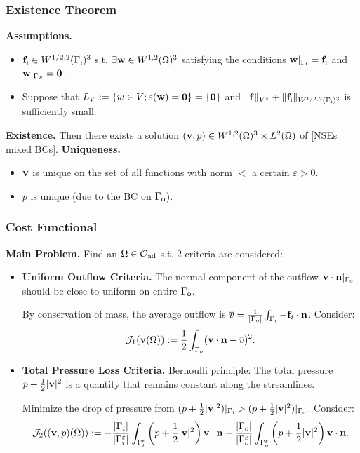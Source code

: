 \documentclass[t,xcolor=table,english]{beamer}   %
\begin{document}
\begin{frame}
	\frametitle{Existence Theorem}
	\begin{theorem}
		\textbf{Assumptions.}
		\begin{itemize}
			\item ${\bf f}_{\rm i}\in W^{1/2,2}(\Gamma_{\rm i})^3$ s.t. $\exists {\bf w}\in W^{1,2}(\Omega)^3$ satisfying the conditions ${\bf w}|_{\Gamma_{\rm i}} = {\bf f}_{\rm i}$ and ${\bf w}|_{\Gamma_{\rm w}} = {\bf 0}$.
			\item Suppose that $L_V := \{w\in V;\varepsilon({\bf w}) = {\bf 0}\} = \{{\bf 0}\}$ and $\|{\bf f}\|_{V^\star} + \|{\bf f}_{\rm i}\|_{W^{1/2,2}(\Gamma_{\rm i})^3}$ is sufficiently small.
		\end{itemize}
		\textbf{Existence.} Then there exists a solution $({\bf v},p)\in W^{1,2}(\Omega)^3\times L^2(\Omega)$ of \eqref{NSEs mixed BCs}.
		\textbf{Uniqueness.}
		\begin{itemize}
			\item ${\bf v}$ is unique on the set of all functions with norm $<$ a certain $\varepsilon > 0$.
			\item $p$ is unique (due to the BC on $\Gamma_{\rm o}$).
		\end{itemize}
	\end{theorem}
\end{frame}

\begin{frame}
	\frametitle{Cost Functional}
	\textbf{Main Problem.} Find an $\Omega\in\mathcal{O}_{\rm ad}$ s.t. 2 criteria are considered:
	\begin{itemize}
		\item \textbf{Uniform Outflow Criteria.} The normal component of the outflow ${\bf v}\cdot{\bf n}|_{\Gamma_{\rm o}}$ should be close to uniform on entire $\Gamma_{\rm o}$.
		
		By conservation of mass, the average outflow is $\overline{v} = \frac{1}{|\Gamma_o|} \int_{\Gamma_i} - {\bf f}_i\cdot {\bf n}$. Consider:	
		\begin{align*}
		\mathcal{J}_1({\bf v}(\Omega)) := \frac{1}{2}\int_{\Gamma_o} ({\bf v}\cdot {\bf n} - \overline{v})^2.
		\end{align*}
		\item \textbf{Total Pressure Loss Criteria.} Bernoulli principle: The total pressure $p + \frac{1}{2}|{\bf v}|^2$ is a quantity that remains constant along the streamlines.
		
		Minimize the drop of pressure from $(p + \frac{1}{2}|{\bf v}|^2)|_{\Gamma_{\rm i}} > (p + \frac{1}{2}|{\bf v}|^2)|_{\Gamma_{\rm o}}$. Consider:
		\begin{align*}
		\mathcal{J}_2(({\bf v},p)(\Omega)) := -\frac{|\Gamma_i|}{|\Gamma_i^\varepsilon|} \int_{\Gamma_i^\epsilon}\left(p + \frac{1}{2}|{\bf v}|^2\right){\bf v}\cdot {\bf n} - \frac{|\Gamma_o|}{|\Gamma_o^\varepsilon|}\int_{\Gamma_o^\varepsilon} \left(p + \frac{1}{2}|{\bf v}|^2\right){\bf v}\cdot {\bf n}.
		\end{align*}
	\end{itemize}
\end{frame}
\end{document}
